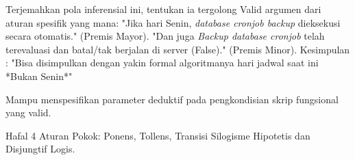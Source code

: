 \documentclass[../main.tex]{subfiles}
\begin{document}
\begin{latihan}
  \item Terjemahkan pola inferensial ini, tentukan ia tergolong Valid argumen dari aturan spesifik yang mana:
  "Jika hari Senin, \textit{database cronjob backup} dieksekusi secara otomatis." (Premis Mayor).
  "Dan juga \textit{Backup database cronjob} telah terevaluasi dan batal/tak berjalan di server (False)." (Premis Minor).
  Kesimpulan : "Bisa disimpulkan dengan yakin formal algoritmanya hari jadwal saat ini *Bukan Senin*"
\end{latihan}

\begin{checklist}
  \item Mampu menspesifikan parameter deduktif pada pengkondisian skrip fungsional yang valid.
  \item Hafal 4 Aturan Pokok: Ponens, Tollens, Transisi Silogisme Hipotetis dan Disjungtif Logis.
\end{checklist}
\end{document}
